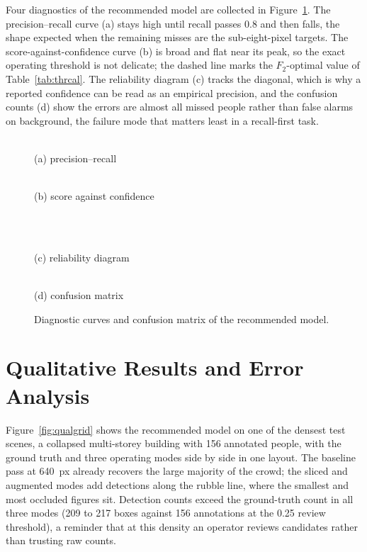 Four diagnostics of the recommended model are collected in
Figure~\ref{fig:diag}. The precision--recall curve (a) stays high until
recall passes $0.8$ and then falls, the shape expected when the remaining
misses are the sub-eight-pixel targets. The score-against-confidence curve
(b) is broad and flat near its peak, so the exact operating threshold is not
delicate; the dashed line marks the $F_2$-optimal value of
Table~\ref{tab:thrcal}. The reliability diagram (c) tracks the diagonal,
which is why a reported confidence can be read as an empirical precision, and
the confusion counts (d) show the errors are almost all missed people rather
than false alarms on background, the failure mode that matters least in a
recall-first task.

\begin{figure}[H]
  \centering
  \begin{minipage}{0.49\linewidth}\centering
    \\[2pt]
    {\small (a) precision--recall}
  \end{minipage}\hfill
  \begin{minipage}{0.49\linewidth}\centering
    \\[2pt]
    {\small (b) score against confidence}
  \end{minipage}\\[6pt]
  \begin{minipage}{0.49\linewidth}\centering
    \\[2pt]
    {\small (c) reliability diagram}
  \end{minipage}\hfill
  \begin{minipage}{0.49\linewidth}\centering
    \\[2pt]
    {\small (d) confusion matrix}
  \end{minipage}
  \caption{Diagnostic curves and confusion matrix of the recommended model.}
  \label{fig:diag}
\end{figure}

\section{Qualitative Results and Error Analysis}
\label{sec:qual}
Figure~\ref{fig:qualgrid} shows the recommended model on one of the densest
test scenes, a collapsed multi-storey building with 156 annotated people,
with the ground truth and three operating modes side by side in one layout.
The baseline pass at 640~px already recovers the large majority of the crowd;
the sliced and augmented modes add detections along the rubble line, where
the smallest and most occluded figures sit. Detection counts exceed the
ground-truth count in all three modes (209 to 217 boxes against 156
annotations at the 0.25 review threshold), a reminder that at this density an
operator reviews candidates rather than trusting raw counts.

